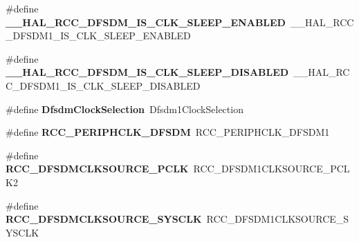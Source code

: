 \begin{DoxyCompactItemize}
\item 
\mbox{\label{group___h_a_l___r_c_c___aliased_ga046dcf6fbcb61994b79a54ba541320ec}} 
\#define {\bfseries \+\_\+\+\_\+\+H\+A\+L\+\_\+\+R\+C\+C\+\_\+\+D\+F\+S\+D\+M\+\_\+\+I\+S\+\_\+\+C\+L\+K\+\_\+\+S\+L\+E\+E\+P\+\_\+\+E\+N\+A\+B\+L\+ED}~\+\_\+\+\_\+\+H\+A\+L\+\_\+\+R\+C\+C\+\_\+\+D\+F\+S\+D\+M1\+\_\+\+I\+S\+\_\+\+C\+L\+K\+\_\+\+S\+L\+E\+E\+P\+\_\+\+E\+N\+A\+B\+L\+ED
\item 
\mbox{\label{group___h_a_l___r_c_c___aliased_ga77b4638afd73a8c4e43baa279655341f}} 
\#define {\bfseries \+\_\+\+\_\+\+H\+A\+L\+\_\+\+R\+C\+C\+\_\+\+D\+F\+S\+D\+M\+\_\+\+I\+S\+\_\+\+C\+L\+K\+\_\+\+S\+L\+E\+E\+P\+\_\+\+D\+I\+S\+A\+B\+L\+ED}~\+\_\+\+\_\+\+H\+A\+L\+\_\+\+R\+C\+C\+\_\+\+D\+F\+S\+D\+M1\+\_\+\+I\+S\+\_\+\+C\+L\+K\+\_\+\+S\+L\+E\+E\+P\+\_\+\+D\+I\+S\+A\+B\+L\+ED
\item 
\mbox{\label{group___h_a_l___r_c_c___aliased_ga245665abb7d8072ff233db26331a6648}} 
\#define {\bfseries Dfsdm\+Clock\+Selection}~Dfsdm1\+Clock\+Selection
\item 
\mbox{\label{group___h_a_l___r_c_c___aliased_ga4a97e8e6929bf5ce0a85b8a92fd5c7e6}} 
\#define {\bfseries R\+C\+C\+\_\+\+P\+E\+R\+I\+P\+H\+C\+L\+K\+\_\+\+D\+F\+S\+DM}~R\+C\+C\+\_\+\+P\+E\+R\+I\+P\+H\+C\+L\+K\+\_\+\+D\+F\+S\+D\+M1
\item 
\mbox{\label{group___h_a_l___r_c_c___aliased_ga947a134f814757c5757eef64b84cc949}} 
\#define {\bfseries R\+C\+C\+\_\+\+D\+F\+S\+D\+M\+C\+L\+K\+S\+O\+U\+R\+C\+E\+\_\+\+P\+C\+LK}~R\+C\+C\+\_\+\+D\+F\+S\+D\+M1\+C\+L\+K\+S\+O\+U\+R\+C\+E\+\_\+\+P\+C\+L\+K2
\item 
\mbox{\label{group___h_a_l___r_c_c___aliased_gad529099e8057474b7e1f86deb9519348}} 
\#define {\bfseries R\+C\+C\+\_\+\+D\+F\+S\+D\+M\+C\+L\+K\+S\+O\+U\+R\+C\+E\+\_\+\+S\+Y\+S\+C\+LK}~R\+C\+C\+\_\+\+D\+F\+S\+D\+M1\+C\+L\+K\+S\+O\+U\+R\+C\+E\+\_\+\+S\+Y\+S\+C\+LK
\item 
\mbox{\label{group___h_a_l___r_c_c___aliased_ga7539e94e5f9445ea0cb18f8fae72579e}} 

\end{DoxyCompactItemize}
